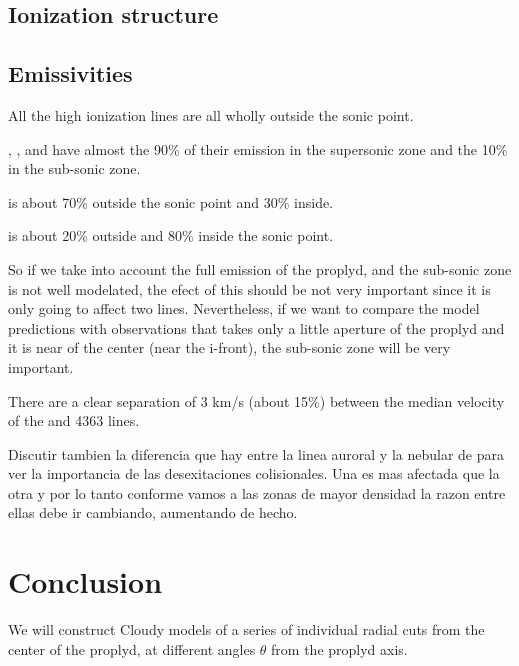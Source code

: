 \documentclass[aaspp]{article}
\begin{document}
\subsection{Ionization structure}
\label{sec:ionization}



\subsection{Emissivities}
\label{sec:emi}

All the high ionization lines are all wholly outside the sonic point.

\neii, \ha, \nii and \oii have almost the 90\% of their emission in the supersonic zone and the 10\% in the sub-sonic zone.

\sii is about 70\% outside the sonic point and 30\% inside.

\oi is about 20\% outside and 80\% inside the sonic point.

So if we take into account the full emission of the proplyd, and the sub-sonic zone is not well modelated, the efect of this should be not very important since it is only going to affect two lines. Nevertheless, if we want to compare the model predictions with observations that takes only a little aperture of the proplyd and it is near of the center (near the i-front), the sub-sonic zone will be very important.

There are a clear separation of 3 km/s (about 15\%) between the median velocity of the  and 4363 lines.

Discutir tambien la diferencia que hay entre la linea auroral y la nebular de \nii para ver la importancia de las desexitaciones colisionales. Una es mas afectada que la otra y por lo tanto conforme vamos a las zonas de mayor densidad la razon entre ellas debe ir cambiando, aumentando de hecho.

\section{Conclusion}
\label{sec:conclusions}

We will construct Cloudy models of a series of individual radial cuts from the center of the proplyd, at different angles $\theta$ from the proplyd axis.




\end{document}
